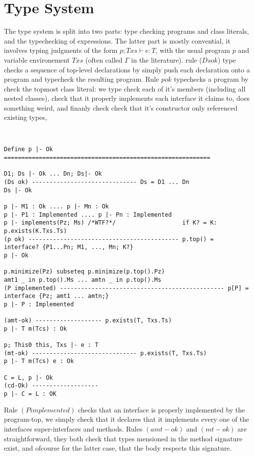 \section{Type System}

The type system is split into two parts: type checking programs and class literals, and the typechecking of expressions. The latter part is mostly convential, it involves typing judgments of the form $p; Txs \vdash e : T$, with the usual program $p$ and variable environement $Txs$ (often called $\Gamma$ in the literature). rule ($Ds ok$) type checks a sequence of top-level declarations by simply push each declaration onto a program and typecheck the resulting program.
Rule $p ok$ typechecks a program by check the topmost class literal: we type check each of it’s members (including all nested classes), check that it properly implements each interface it claims to, does something weird, and finanly check check that it’s constructor only referenced existing types,

\begin{verbatim}


Define p |- Ok
===========================================================

D1; Ds |- Ok ... Dn; Ds|- Ok
(Ds ok) ------------------------------ Ds = D1 ... Dn
Ds |- Ok

p |- M1 : Ok .... p |- Mn : Ok
p |- P1 : Implemented .... p |- Pn : Implemented
p |- implements(Pz; Ms) /*WTF?*/                   if K? = K: p.exists(K.Txs.Ts)
(p ok) ------------------------------------------- p.top() = interface? {P1...Pn; M1, ..., Mn; K?}
p |- Ok

p.minimize(Pz) subseteq p.minimize(p.top().Pz)
amt1 _ in p.top().Ms ... amtn _ in p.top().Ms
(P implemented) ----------------------------------------------- p[P] = interface {Pz; amt1 ... amtn;}
p |- P : Implemented

(amt-ok) ------------------- p.exists(T, Txs.Ts)
p |- T m(Tcs) : Ok

p; This0 this, Txs |- e : T
(mt-ok) ------------------------------ p.exists(T, Txs.Ts)
p |- T m(Tcs) e : Ok

C = L, p |- Ok
(cd-Ok) -------------------
p |- C = L : OK

\end{verbatim}

Rule $(P implemented)$ checks that an interface is properly implemented by the program-top, we simply check that it declares that it implements every one of the interfaces super-interfaces and methods.
Rules $(amt-ok)$ and $(mt-ok)$ are straightforward, they both check that types mensioned in the method signature exist, and ofcourse for the latter case, that the body respects this signature.

